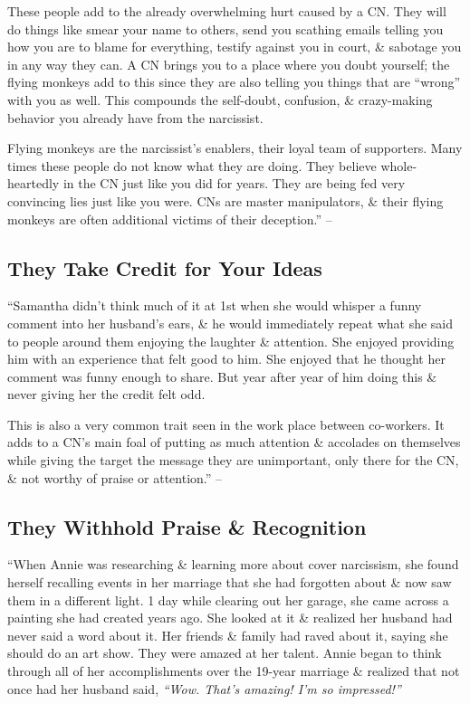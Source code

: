 \documentclass{article}
\numberwithin{equation}{section}
\begin{document}
These people add to the already overwhelming hurt caused by a CN. They will do things like smear your name to others, send you scathing emails telling you how you are to blame for everything, testify against you in court, \& sabotage you in any way they can. A CN brings you to a place where you doubt yourself; the flying monkeys add to this since they are also telling you things that are ``wrong'' with you as well. This compounds the self-doubt, confusion, \& crazy-making behavior you already have from the narcissist.

Flying monkeys are the narcissist's enablers, their loyal team of supporters. Many times these people do not know what they are doing. They believe whole-heartedly in the CN just like you did for years. They are being fed very convincing lies just like you were. CNs are master manipulators, \& their flying monkeys are often additional victims of their deception.'' -- \cite[pp. 60--61]{Mirza2017}

\subsection{They Take Credit for Your Ideas}
``Samantha didn't think much of it at 1st when she would whisper a funny comment into her husband's ears, \& he would immediately repeat what she said to people around them enjoying the laughter \& attention. She enjoyed providing him with an experience that felt good to him. She enjoyed that he thought her comment was funny enough to share. But year after year of him doing this \& never giving her the credit felt odd.

This is also a very common trait seen in the work place between co-workers. It adds to a CN's main foal of putting as much attention \& accolades on themselves while giving the target the message they are unimportant, only there for the CN, \& not worthy of praise or attention.'' -- \cite[p. 61]{Mirza2017}

\subsection{They Withhold Praise \& Recognition}
``When Annie was researching \& learning more about cover narcissism, she found herself recalling events in her marriage that she had forgotten about \& now saw them in a different light. 1 day while clearing out her garage, she came across a painting she had created years ago. She looked at it \& realized her husband had never said a word about it. Her friends \& family had raved about it, saying she should do an art show. They were amazed at her talent. Annie began to think through all of her accomplishments over the 19-year marriage \& realized that not once had her husband said, \textit{``Wow. That's amazing! I'm so impressed!''}
\end{document}
